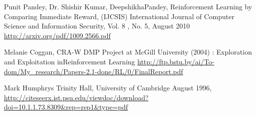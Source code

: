 \begin{thebibliography}{99}
 Punit Pandey, Dr. Shishir Kumar, DeepshikhaPandey,
Reinforcement Learning by Comparing Immediate Reward, (IJCSIS)
International Journal of Computer Science and Information Security, Vol. 8
, No. 5, August 2010
\url{http://arxiv.org/pdf/1009.2566.pdf}

 Melanie Coggan, CRA-W DMP Project at McGill University (2004) :
Exploration and Exploitation inReinforcement Learning
\url{http://ftp.bstu.by/ai/To-dom/My_research/Papers-2.1-done/RL/0/FinalReport.pdf}

 Mark Humphrys Trinity Hall, University of Cambridge August 1996,
\url{http://citeseerx.ist.psu.edu/viewdoc/download?doi=10.1.1.73.8309&rep=rep1&type=pdf}

\end{thebibliography}
